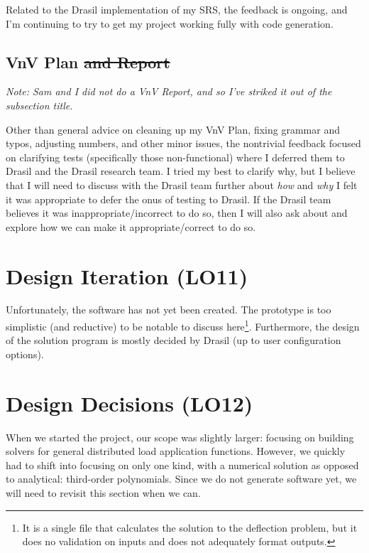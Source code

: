 \documentclass{article}
\begin{document}
Related to the Drasil implementation of my SRS, the feedback is ongoing, and I'm
continuing to try to get my project working fully with code generation.

\subsection{VnV Plan \sout{and Report}}

\textit{Note: Sam and I did not do a VnV Report, and so I've striked it out of
    the subsection title.}

Other than general advice on cleaning up my VnV Plan, fixing grammar and typos,
adjusting numbers, and other minor issues, the nontrivial feedback focused on
clarifying tests (specifically those non-functional) where I deferred them to
Drasil and the Drasil research team. I tried my best to clarify why, but I
believe that I will need to discuss with the Drasil team further about
\textit{how} and \textit{why} I felt it was appropriate to defer the onus of
testing to Drasil. If the Drasil team believes it was inappropriate/incorrect to
do so, then I will also ask about and explore how we can make it
appropriate/correct to do so.

\section{Design Iteration (LO11)}

Unfortunately, the software has not yet been created. The prototype is too
simplistic (and reductive) to be notable to discuss here\footnote{It is a single
file that calculates the solution to the deflection problem, but it does no
validation on inputs and does not adequately format outputs.}. Furthermore, the
design of the solution program is mostly decided by Drasil (up to user
configuration options).

\section{Design Decisions (LO12)}
\label{design-decisions}

When we started the project, our scope was slightly larger: focusing on building
solvers for general distributed load application functions. However, we quickly
had to shift into focusing on only one kind, with a numerical solution as
opposed to analytical: third-order polynomials. Since we do not generate
software yet, we will need to revisit this section when we can.
\end{document}
